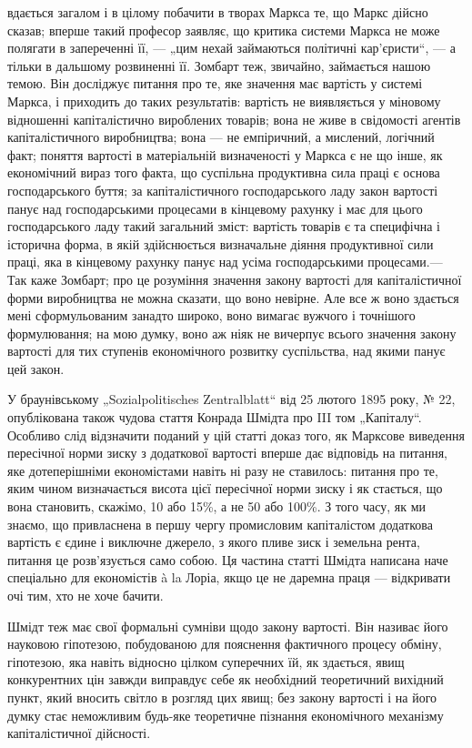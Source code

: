 \parcont{}  %
вдається загалом і в цілому побачити в творах Маркса те, що Маркс дійсно сказав; вперше такий професор заявляє, що
критика системи Маркса не може полягати в запереченні її, — „цим нехай займаються політичні кар’єристи“, — а тільки в дальшому
розвиненні її. Зомбарт теж, звичайно, займається нашою темою. Він досліджує питання про те, яке значення має вартість у
системі Маркса, і приходить до таких результатів: вартість не виявляється у міновому відношенні капіталістично
вироблених товарів; вона не живе в свідомості агентів капіталістичного виробництва; вона — не емпіричний, а мислений,
логічний факт; поняття вартості в матеріальній визначеності у Маркса є не що інше, як економічний вираз того факта, що
суспільна продуктивна сила праці є основа господарського буття; за капіталістичного господарського ладу закон вартості панує
над господарськими процесами в кінцевому рахунку і має для цього господарського ладу такий загальний зміст: вартість товарів
є та специфічна і історична форма, в якій здійснюється визначальне діяння продуктивної сили праці, яка в кінцевому рахунку
панує над усіма господарськими процесами.— Так каже Зомбарт; про це розуміння значення закону вартості для капіталістичної
форми виробництва не можна сказати, що воно невірне. Але все ж воно здається мені сформульованим занадто широко, воно
вимагає вужчого і точнішого формулювання; на мою думку, воно аж ніяк не вичерпує всього значення закону вартості для тих
ступенів економічного розвитку суспільства, над якими панує цей закон.

У браунівському „Sozialpolitisches Zentralblatt“ від
25 лютого 1895 року, № 22, опублікована також чудова стаття Конрада Шмідта про III том „Капіталу“. Особливо слід відзначити
поданий у цій статті доказ того, як Марксове виведення пересічної норми зиску з додаткової вартості вперше дає відповідь на
питання, яке дотеперішніми економістами навіть ні разу не ставилось:  питання про те, яким чином визначається висота цієї
пересічної норми зиску і як стається, що вона становить, скажімо, 10 або 15\%, а не 50 або 100\%. З того часу, як ми
знаємо, що привласнена в першу чергу промисловим капіталістом додаткова вартість є єдине і виключне джерело, з якого пливе
зиск і земельна рента, питання це розв’язується само собою. Ця частина статті Шмідта написана наче спеціально для
економістів à la Лоріа, якщо це не даремна праця — відкривати очі тим, хто не хоче бачити.

Шмідт теж має свої формальні
сумніви щодо закону вартості. Він називає його науковою гіпотезою, побудованою для пояснення фактичного процесу обміну,
гіпотезою, яка навіть відносно цілком суперечних їй, як здається, явищ конкурентних цін завжди виправдує себе як необхідний
теоретичний вихідний пункт, який вносить світло в розгляд цих явищ; без закону вартості і на його думку стає неможливим
будь-яке теоретичне пізнання економічного механізму капіталістичної дійсності.
\parbreak{}  %
